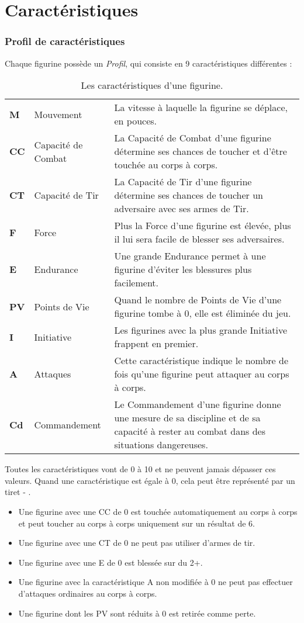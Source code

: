
\part{Caractéristiques}

\section{Profil de caractéristiques}

Chaque figurine possède un \emph{Profil}, qui consiste en 9 caractéristiques différentes : 
\begin{table}[!htbp]
\centering
\begin{tabular}{M{1,5cm}M{3cm}M{10cm}}
\textbf{M} & Mouvement & La vitesse à laquelle la figurine se déplace, en pouces. \tabularnewline
\textbf{CC} & Capacité de Combat & La Capacité de Combat d’une figurine détermine ses chances de toucher et d’être touchée au corps à corps. \tabularnewline
\textbf{CT} & Capacité de Tir & La Capacité de Tir d'une figurine détermine ses chances de toucher un adversaire avec ses armes de Tir. \tabularnewline
\textbf{F} & Force & Plus la Force d'une figurine est élevée, plus il lui sera facile de blesser ses adversaires. \tabularnewline
\textbf{E} & Endurance & Une grande Endurance permet à une figurine d'éviter les blessures plus facilement. \tabularnewline
\textbf{PV} & Points de Vie & Quand le nombre de Points de Vie d'une figurine tombe à 0, elle est éliminée du jeu. \tabularnewline
\textbf{I} & Initiative & Les figurines avec la plus grande Initiative frappent en premier. \tabularnewline
\textbf{A} & Attaques & Cette caractéristique indique le nombre de fois qu'une figurine peut attaquer au corps à corps. \tabularnewline
\textbf{Cd} & Commandement & Le Commandement d'une figurine donne une mesure de sa discipline et de sa capacité à rester au combat dans des situations dangereuses. \tabularnewline
\end{tabular}
\caption{\label{table/caractéristiques}Les caractéristiques d'une figurine.}
\end{table}


Toutes les caractéristiques vont de 0 à 10 et ne peuvent jamais dépasser ces valeurs. Quand une caractéristique est égale à 0, cela peut être représenté par un tiret \og - \fg {}.

\begin{itemize}[label={-}]
\item Une figurine avec une CC de 0 est touchée automatiquement au corps à corps et peut toucher au corps à corps uniquement sur un résultat de 6.
\item Une figurine avec une CT de 0 ne peut pas utiliser d'armes de tir.
\item Une figurine avec une E de 0 est blessée sur du 2+.
\item Une figurine avec la caractéristique A non modifiée à 0 ne peut pas effectuer d'attaques ordinaires au corps à corps.
\item Une figurine dont les PV sont réduits à 0 est retirée comme perte.
\end{itemize}


